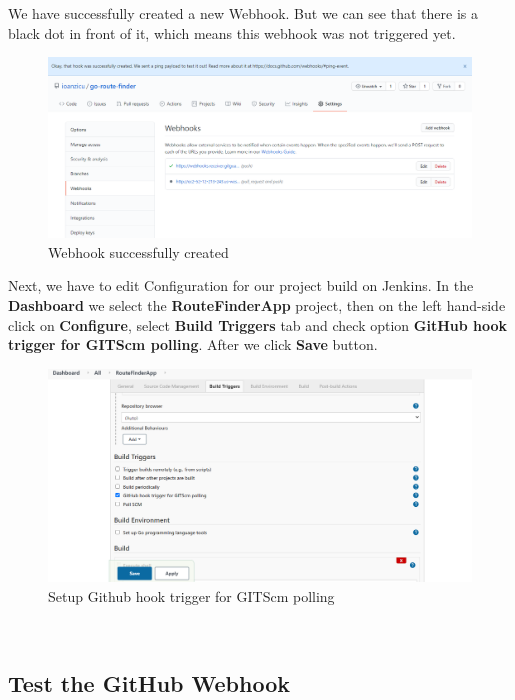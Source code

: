 \documentclass[12pt,a4paper,twoside]{article}
\begin{document}
We have successfully created a new Webhook. But we can see that there is a black dot in  front of it, which means this webhook was not triggered yet.


\begin{figure}[H]
    \centering
        \includegraphics[width=15cm]{images-aws/45-web-hook-created.png}
        \caption{Webhook successfully created}
\end{figure}


Next, we have to edit Configuration for our project build on Jenkins. In the \textbf{Dashboard} we select the \textbf{RouteFinderApp} project, then on the left hand-side click on \textbf{Configure}, select \textbf{Build Triggers} tab and check option \textbf{GitHub hook trigger for GITScm polling}. After we click \textbf{Save} button.


\begin{figure}[H]
    \centering
        \includegraphics[width=15cm]{images-aws/46-trigger-jenkins.png}
        \caption{Setup Github hook trigger for GITScm polling}
\end{figure}




~\newpage


\subsection{Test the GitHub Webhook}
\end{document}
